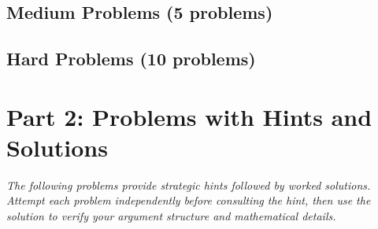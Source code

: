 \documentclass[12pt]{article}
\begin{document}

\newpage


\newpage


\newpage


\newpage


\newpage


\newpage

\subsection*{Medium Problems (5 problems)}


\newpage


\newpage


\newpage


\newpage


\newpage

\subsection*{Hard Problems (10 problems)}


\newpage


\newpage


\newpage


\newpage


\newpage


\newpage


\newpage


\newpage


\newpage


\newpage

\section{Part 2: Problems with Hints and Solutions}

\textit{The following problems provide strategic hints followed by worked solutions. Attempt each problem independently before consulting the hint, then use the solution to verify your argument structure and mathematical details.}
\end{document}
